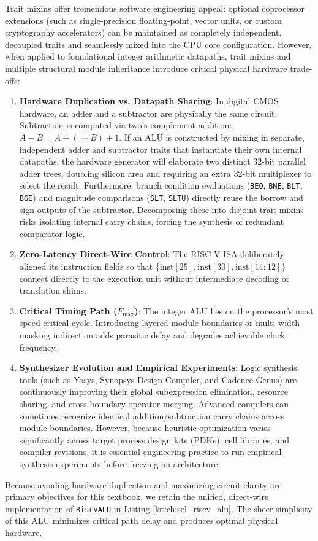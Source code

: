 {Trait mixins offer tremendous software engineering appeal: optional coprocessor extensions (such as single-precision floating-point, vector units, or custom cryptography accelerators) can be maintained as completely independent, decoupled traits and seamlessly mixed into the CPU core configuration. However, when applied to foundational integer arithmetic datapaths, trait mixins and multiple structural module inheritance introduce critical physical hardware trade-offs:
\begin{enumerate}
    \item \textbf{Hardware Duplication vs. Datapath Sharing}: In digital CMOS hardware, an adder and a subtractor are physically the same circuit. Subtraction is computed via two's complement addition: $A - B = A + (\sim B) + 1$. If an ALU is constructed by mixing in separate, independent adder and subtractor traits that instantiate their own internal datapaths, the hardware generator will elaborate two distinct 32-bit parallel adder trees, doubling silicon area and requiring an extra 32-bit multiplexer to select the result. Furthermore, branch condition evaluations (\texttt{BEQ}, \texttt{BNE}, \texttt{BLT}, \texttt{BGE}) and magnitude comparisons (\texttt{SLT}, \texttt{SLTU}) directly reuse the borrow and sign outputs of the subtractor. Decomposing these into disjoint trait mixins risks isolating internal carry chains, forcing the synthesis of redundant comparator logic.
    \item \textbf{Zero-Latency Direct-Wire Control}: The RISC-V ISA deliberately aligned its instruction fields so that $\{\text{inst}[25], \text{inst}[30], \text{inst}[14:12]\}$ connect directly to the execution unit without intermediate decoding or translation shims.
    \item \textbf{Critical Timing Path ($F_{\max}$)}: The integer ALU lies on the processor's most speed-critical cycle. Introducing layered module boundaries or multi-width masking indirection adds parasitic delay and degrades achievable clock frequency.
    \item \textbf{Synthesizer Evolution and Empirical Experiments}: Logic synthesis tools (such as Yosys, Synopsys Design Compiler, and Cadence Genus) are continuously improving their global subexpression elimination, resource sharing, and cross-boundary operator merging. Advanced compilers can sometimes recognize identical addition/subtraction carry chains across module boundaries. However, because heuristic optimization varies significantly across target process design kits (PDKs), cell libraries, and compiler revisions, it is essential engineering practice to run empirical synthesis experiments before freezing an architecture.
\end{enumerate}
Because avoiding hardware duplication and maximizing circuit clarity are primary objectives for this textbook, we retain the unified, direct-wire implementation of \texttt{RiscvALU} in Listing \ref{lst:chisel_riscv_alu}. The sheer simplicity of this ALU minimizes critical path delay and produces optimal physical hardware.


}
